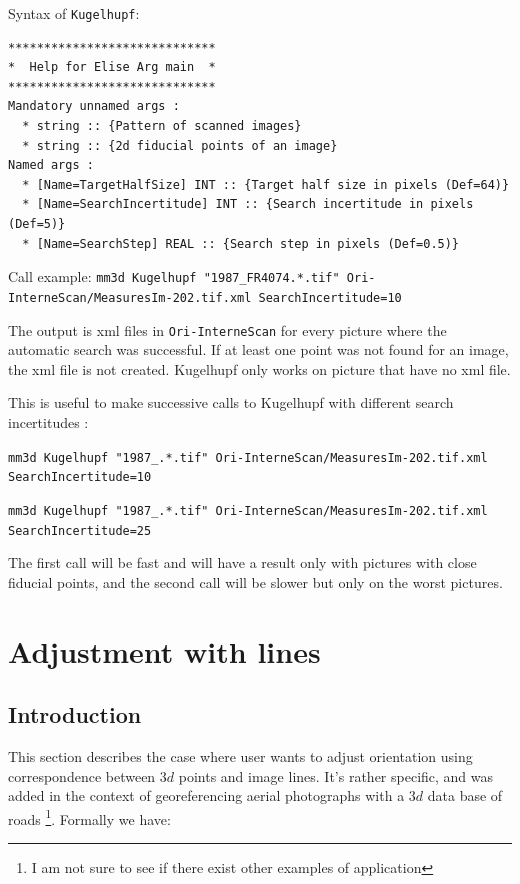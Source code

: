 Syntax of {\tt Kugelhupf}:
\begin{verbatim}
*****************************
*  Help for Elise Arg main  *
*****************************
Mandatory unnamed args : 
  * string :: {Pattern of scanned images}
  * string :: {2d fiducial points of an image}
Named args : 
  * [Name=TargetHalfSize] INT :: {Target half size in pixels (Def=64)}
  * [Name=SearchIncertitude] INT :: {Search incertitude in pixels (Def=5)}
  * [Name=SearchStep] REAL :: {Search step in pixels (Def=0.5)}
\end{verbatim}

Call example:
{\tt mm3d Kugelhupf "1987\_FR4074.*.tif" Ori-InterneScan/MeasuresIm-202.tif.xml SearchIncertitude=10 }

The output is xml files in {\tt Ori-InterneScan} for every picture where the automatic search was successful.
If at least one point was not found for an image, the xml file is not created.
Kugelhupf only works on picture that have no xml file.

This is useful to make successive calls to Kugelhupf with different search incertitudes :

{\tt mm3d Kugelhupf "1987\_.*.tif" Ori-InterneScan/MeasuresIm-202.tif.xml SearchIncertitude=10}

{\tt mm3d Kugelhupf "1987\_.*.tif" Ori-InterneScan/MeasuresIm-202.tif.xml SearchIncertitude=25}


The first call will be fast and will have a result only with pictures with close fiducial points, and the second call will
be slower but only on the worst pictures.


\section{Adjustment with lines}



\subsection{Introduction}

This section describes the case where user wants to adjust orientation using correspondence between $3d$ points
and image lines. It's rather specific, and was added in the context of georeferencing aerial photographs with a $3d$
data base of roads \footnote{I am not sure to see if there exist other examples of application}. Formally we have:

